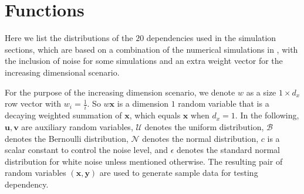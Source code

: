 \documentclass[11pt]{article}
\providecommand{\mb}[1]{\boldsymbol{#1}}
\providecommand{\mc}[1]{\mathcal{#1}}
\begin{document}
\section{Functions}
\label{appen:function}

Here we list the distributions of the $20$ dependencies used in the simulation sections, which are based on a combination of the numerical simulations in \cite{SzekelyRizzoBakirov2007, SimonTibshirani2012, SimonTibshirani2012, GorfineHellerHeller2012}, with the inclusion of noise for some simulations and an extra weight vector for the increasing dimensional scenario.

For the purpose of the increasing dimension scenario, we denote $w$ as a size $1 \times d_{x}$ row vector with $w_{i}=\frac{1}{i}$. So $w\mb{x}$ is a dimension $1$ random variable that is a decaying weighted summation of $\mb{x}$, which equals $\mb{x}$ when $d_{x}=1$. In the following, $\mb{u}, \mb{v}$ are auxiliary random variables, $\mc{U}$ denotes the uniform distribution, $\mc{B}$ denotes the Bernoulli distribution, $\mc{N}$ denotes the normal distribution, $c$ is a scalar constant to control the noise level, and $\epsilon$ denotes the standard normal distribution for white noise unless mentioned otherwise. The resulting pair of random variables $(\mb{x},\mb{y})$ are used to generate sample data for testing dependency.
\end{document}

